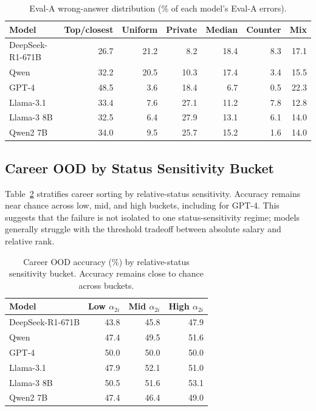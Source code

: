 \begin{table}[h]
\centering
\small
\setlength{\tabcolsep}{3pt}
\begin{tabular}{@{}lrrrrrr@{}}
\toprule
\textbf{Model} & \textbf{Top/closest} & \textbf{Uniform} & \textbf{Private} & \textbf{Median} & \textbf{Counter} & \textbf{Mix} \\
\midrule
DeepSeek-R1-671B & 26.7 & 21.2 & 8.2 & 18.4 & 8.3 & 17.1 \\
Qwen & 32.2 & 20.5 & 10.3 & 17.4 & 3.4 & 15.5 \\
GPT-4 & 48.5 & 3.6 & 18.4 & 6.7 & 0.5 & 22.3 \\
Llama-3.1 & 33.4 & 7.6 & 27.1 & 11.2 & 7.8 & 12.8 \\
Llama-3 8B & 32.5 & 6.4 & 27.9 & 13.1 & 6.1 & 14.0 \\
Qwen2 7B & 34.0 & 9.5 & 25.7 & 15.2 & 1.6 & 14.0 \\
\bottomrule
\end{tabular}
\caption{Eval-A wrong-answer distribution (\% of each model's Eval-A errors).}
\label{tab:evala_rule_confusions}
\end{table}

\subsection{Career OOD by Status Sensitivity Bucket}

Table~\ref{tab:career_alpha2} stratifies career sorting by relative-status
sensitivity. Accuracy remains near chance across low, mid, and high buckets,
including for GPT-4. This suggests that the failure is not isolated to one
status-sensitivity regime; models generally struggle with the threshold tradeoff
between absolute salary and relative rank.

\begin{table}[h]
\centering
\small
\setlength{\tabcolsep}{6pt}
\begin{tabular}{@{}lrrr@{}}
\toprule
\textbf{Model} & \textbf{Low $\alpha_{2i}$} & \textbf{Mid $\alpha_{2i}$} & \textbf{High $\alpha_{2i}$} \\
\midrule
DeepSeek-R1-671B & 43.8 & 45.8 & 47.9 \\
Qwen & 47.4 & 49.5 & 51.6 \\
GPT-4 & 50.0 & 50.0 & 50.0 \\
Llama-3.1 & 47.9 & 52.1 & 51.0 \\
Llama-3 8B & 50.5 & 51.6 & 53.1 \\
Qwen2 7B & 47.4 & 46.4 & 49.0 \\
\bottomrule
\end{tabular}
\caption{Career OOD accuracy (\%) by relative-status sensitivity bucket. Accuracy remains close to chance across buckets.}
\label{tab:career_alpha2}
\end{table}
